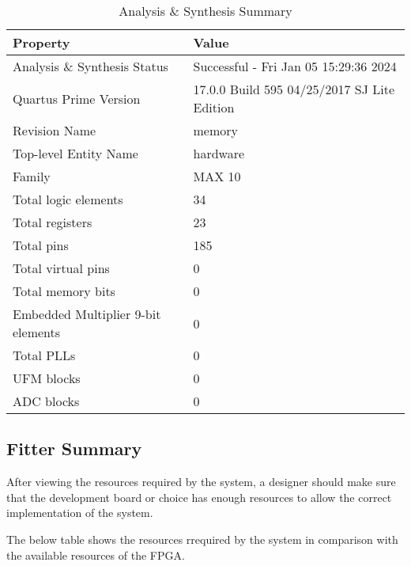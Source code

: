 \begin{table}[H]
	\centering
	\caption{Analysis \& Synthesis Summary}
	\begin{tabular}{ll}
		\toprule
		\textbf{Property} & \textbf{Value} \\
		\midrule
		Analysis \& Synthesis Status & Successful - Fri Jan 05 15:29:36 2024 \\
		Quartus Prime Version & 17.0.0 Build 595 04/25/2017 SJ Lite Edition \\
		Revision Name & memory \\
		Top-level Entity Name & hardware \\
		Family & MAX 10 \\
		Total logic elements & 34 \\
		Total registers & 23 \\
		Total pins & 185 \\
		Total virtual pins & 0 \\
		Total memory bits & 0 \\
		Embedded Multiplier 9-bit elements & 0 \\
		Total PLLs & 0 \\
		UFM blocks & 0 \\
		ADC blocks & 0 \\
		\bottomrule
	\end{tabular}
\end{table}

\subsection{Fitter Summary}
\par After viewing the resources required by the system, a designer should make sure that the development board or choice has enough resources to allow the correct implementation of the system. \newline
\par The below table shows the resources rrequired by the system in comparison with the available resources of the FPGA. \newline

